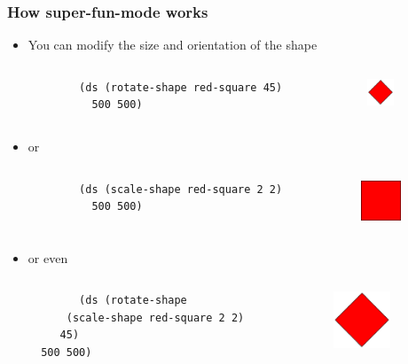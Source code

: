 \documentclass{beamer}
\begin{document}
\begin{frame}[fragile]
	\frametitle{How super-fun-mode works}
	\begin{itemize}
	\item You can modify the size and orientation of the shape
	\begin{columns}[t]
		\begin{column}{.45\textwidth}
		\begin{verbatim}
		(ds (rotate-shape red-square 45) 
		  500 500)
		\end{verbatim}
		\end{column}
		\begin{column}{.3\textwidth}
		\begin{figure}[h]
			\includegraphics[width=0.8cm]{PresentationImages/red-rectangle-rotate.png}
			\end{figure}		
		\end{column}
		\end{columns}
		\item or 
		\begin{columns}[t]
		\begin{column}{.45\textwidth}
		\begin{verbatim}
		(ds (scale-shape red-square 2 2) 
		  500 500)
		\end{verbatim}
		\end{column}
		\begin{column}{.3\textwidth}
		\begin{figure}[h]
			\includegraphics[width=1.2cm]{PresentationImages/red-rectangle-scale.png}
			\end{figure}		
		\end{column}
		\end{columns}
		\item or even 
		\begin{columns}[t]
		\begin{column}{.45\textwidth}
		\begin{verbatim}
		(ds (rotate-shape 
      (scale-shape red-square 2 2) 
     45)
  500 500)
		\end{verbatim}
		\end{column}
		\begin{column}{.3\textwidth}
		\begin{figure}[h]
			\includegraphics[width=1.7cm]{PresentationImages/red-rectangle-scale-rotate.png}
			\end{figure}		
		\end{column}
		\end{columns}
	\end{itemize}
\end{frame}
\end{document}
